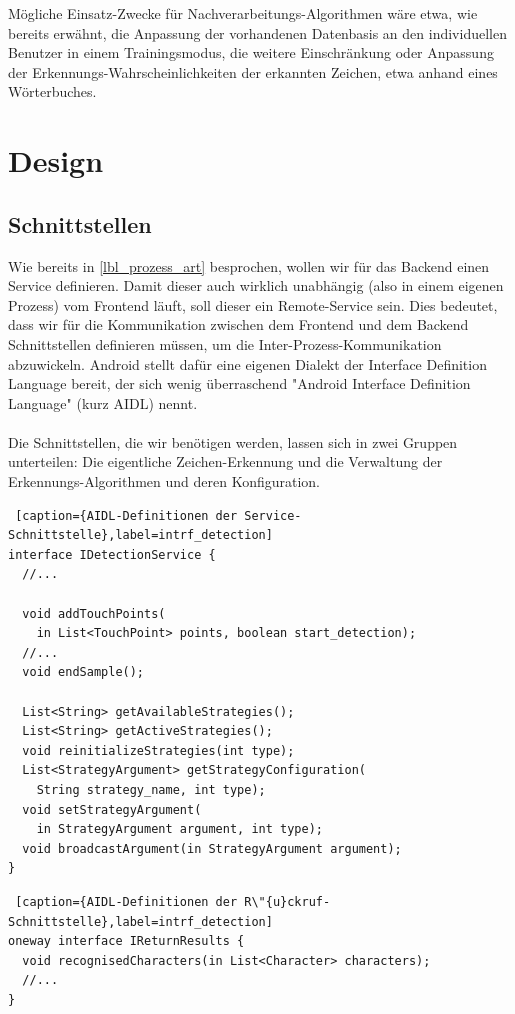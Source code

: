 Mögliche Einsatz-Zwecke für Nachverarbeitungs-Algorithmen wäre etwa, wie bereits erwähnt, die Anpassung der vorhandenen Datenbasis an den individuellen Benutzer in einem Trainingsmodus, die weitere Einschränkung oder Anpassung der Erkennungs-Wahrscheinlichkeiten der erkannten Zeichen, etwa anhand eines Wörterbuches.

\section{Design}

\subsection{Schnittstellen}

Wie bereits in \ref{lbl_prozess_art} besprochen, wollen wir für das Backend einen Service definieren. Damit dieser auch wirklich unabhängig (also in einem eigenen Prozess) vom Frontend läuft, soll dieser ein Remote-Service sein. Dies bedeutet, dass wir für die Kommunikation zwischen dem Frontend und dem Backend Schnittstellen definieren müssen, um die Inter-Prozess-Kommunikation abzuwickeln. Android stellt dafür eine eigenen Dialekt der Interface Definition Language bereit, der sich wenig überraschend "Android Interface Definition Language" (kurz AIDL) nennt.\\
\\
Die Schnittstellen, die wir benötigen werden, lassen sich in zwei Gruppen unterteilen: Die eigentliche Zeichen-Erkennung und die Verwaltung der Erkennungs-Algorithmen und deren Konfiguration.\\

\begin{lstlisting} [caption={AIDL-Definitionen der Service-Schnittstelle},label=intrf_detection]
interface IDetectionService {
  //...

  void addTouchPoints(
    in List<TouchPoint> points, boolean start_detection);
  //...
  void endSample();

  List<String> getAvailableStrategies();
  List<String> getActiveStrategies();
  void reinitializeStrategies(int type);
  List<StrategyArgument> getStrategyConfiguration(
    String strategy_name, int type);
  void setStrategyArgument(
    in StrategyArgument argument, int type);
  void broadcastArgument(in StrategyArgument argument);
}
\end{lstlisting}

\begin{lstlisting} [caption={AIDL-Definitionen der R\"{u}ckruf-Schnittstelle},label=intrf_detection]
oneway interface IReturnResults {
  void recognisedCharacters(in List<Character> characters);
  //...
}
\end{lstlisting}

